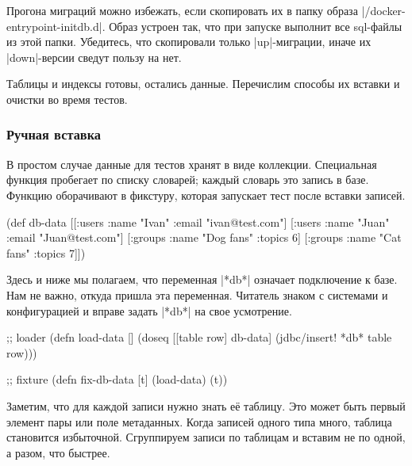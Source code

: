 Прогона миграций можно избежать, если скопировать их в папку образа
\spverb|/docker-entrypoint-initdb.d|. Образ устроен так, что при запуске
выполнит все sql-файлы из этой папки. Убедитесь, что скопировали только
\spverb|up|-миграции, иначе их \spverb|down|-версии сведут пользу на нет.

Таблицы и индексы готовы, остались данные. Перечислим способы их вставки и
очистки во время тестов.

\subsubsection*{Ручная вставка}

В простом случае данные для тестов хранят в виде коллекции. Специальная функция
пробегает по списку словарей; каждый словарь это запись в базе. Функцию
оборачивают в фикстуру, которая запускает тест после вставки записей.

\begin{english}
  \begin{clojure}
(def db-data
  [[:users {:name "Ivan" :email "ivan@test.com"}]
   [:users {:name "Juan" :email "Juan@test.com"}]
   [:groups {:name "Dog fans" :topics 6}]
   [:groups {:name "Cat fans" :topics 7}]])
  \end{clojure}
\end{english}


Здесь и ниже мы полагаем, что переменная \spverb|*db*| означает подключение к
базе. Нам не важно, откуда пришла эта переменная. Читатель знаком с системами и
конфигурацией и вправе задать \spverb|*db*| на свое усмотрение.

\begin{english}
  \begin{clojure}
;; loader
(defn load-data []
  (doseq [[table row] db-data]
    (jdbc/insert! *db* table row)))

;; fixture
(defn fix-db-data [t]
  (load-data)
  (t))
  \end{clojure}
\end{english}

Заметим, что для каждой записи нужно знать е\"{е} таблицу. Это может быть первый
элемент пары  или поле метаданных. Когда записей одного
типа много, таблица становится избыточной. Сгруппируем записи по таблицам и
вставим не по одной, а разом, что быстрее.


